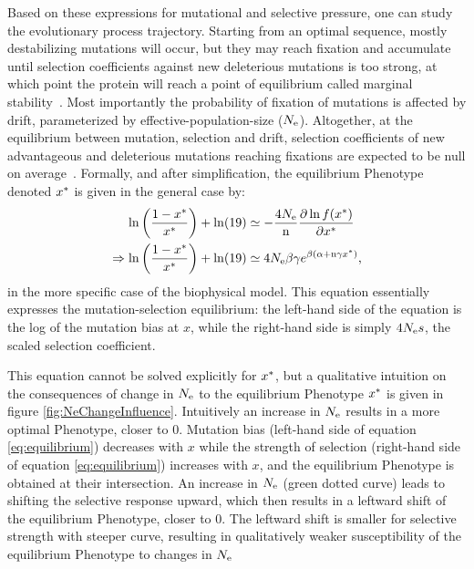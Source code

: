 Based on these expressions for mutational and selective pressure, one can study the evolutionary process trajectory.
Starting from an optimal sequence, mostly destabilizing mutations will occur, but they may reach fixation and accumulate until selection coefficients against new deleterious mutations is too strong, at which point the protein will reach a point of equilibrium called marginal stability~\citep{Taverna2002, Bloom2007}.
Most importantly the probability of fixation of mutations is affected by \gls{drift}, parameterized by \gls{effective-population-size} ($N_{\mathrm{e}}$).
Altogether, at the equilibrium between mutation, selection and drift, selection coefficients of new advantageous and deleterious mutations reaching fixations are expected to be null on average~\citep{Goldstein2013}.
Formally, and after simplification, the equilibrium \gls{Phenotype} denoted $x^{*}$ is given in the general case by:
\begin{align}
 \ln \left( \frac{1 - x\eq}{x\eq} \right) + \ln (19) & \simeq - \frac{4\Ne}{\Nsite} \frac{ \partial \ln f(x\eq) }{\partial {x\eq}} \\
 \Rightarrow \ln \left( \frac{1 - x\eq}{x\eq} \right) + \ln (19) & \simeq 4\Ne \beta \gamma e^{\beta (\DeltaGmin + \Nsite \gamma x\eq)} \text{,} \label{eq:equilibrium}
\end{align}
in the more specific case of the biophysical model. This equation essentially expresses the mutation-selection equilibrium: the left-hand side of the equation is the log of the mutation bias at $x$, while the right-hand side is simply $4 N_{\mathrm{e}} s$, the scaled selection coefficient.

This equation cannot be solved explicitly for $x^{*}$, but a qualitative intuition on the consequences of change in $N_{\mathrm{e}}$ to the equilibrium \gls{Phenotype} $x^{*}$ is given in figure \ref{fig:NeChangeInfluence}.
Intuitively an increase in $N_{\mathrm{e}}$ results in a more optimal \gls{Phenotype}, closer to $0$.
Mutation bias (left-hand side of equation \ref{eq:equilibrium}) decreases with $x$ while the strength of selection (right-hand side of equation \ref{eq:equilibrium}) increases with $x$, and the equilibrium \gls{Phenotype} is obtained at their intersection.
An increase in $N_{\mathrm{e}}$ (green dotted curve) leads to shifting the selective response upward, which then results in a leftward shift of the equilibrium \gls{Phenotype}, closer to $0$.
The leftward shift is smaller for selective strength with steeper curve, resulting in qualitatively weaker susceptibility of the equilibrium \gls{Phenotype} to changes in $N_{\mathrm{e}}$

